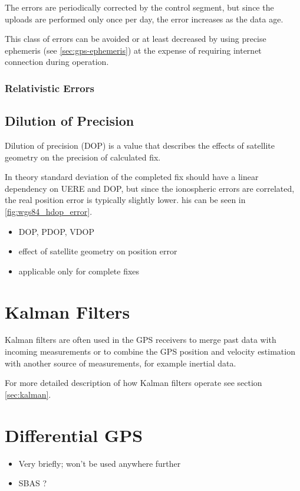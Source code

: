 The errors are periodically corrected by the control segment, but since the uploads are performed
only once per day, the error increases as the data age.

This class of errors can be avoided or at least decreased by using precise ephemeris (see \autoref{sec:gps-ephemeris})
at the expense of requiring internet connection during operation.

\subsubsection{Relativistic Errors}

\subsection{Dilution of Precision}
\label{sec:gps-dop}

Dilution of precision (DOP) is a value that describes the effects of satellite geometry
on the precision of calculated fix.

In theory standard deviation of the completed fix should have a linear dependency on
UERE and DOP, but since the ionospheric errors are correlated, the real position error is
typically slightly lower.
his can be seen in \autoref{fig:wgs84_hdop_error}.

\begin{itemize}
\item DOP, PDOP, VDOP
\item effect of satellite geometry on position error
\item applicable only for complete fixes
\end{itemize}

\section{Kalman Filters}
Kalman filters are often used in the GPS receivers to merge past
data with incoming measurements or to combine the GPS position and velocity
estimation with another source of measurements, for example inertial data.

For more detailed description of how Kalman filters operate see section
\ref{sec:kalman}.

\section{Differential GPS}
\label{sec:dgps}
\begin{itemize}
\item Very briefly; won't be used anywhere further
\item SBAS ?
\end{itemize}


